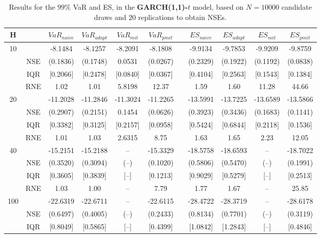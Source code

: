 \footnotesize{  
{ \renewcommand{\arraystretch}{1.3} 
\begin{longtable}{ccccccccccc}  
\caption{Results for the $99\%$ VaR and ES, in the \textbf{GARCH(1,1)-$t$} model, based on $N=10000$ candidate draws and $20$ replications to obtain NSEs.} 
\label{tab:res_algos_t_garch2_noS} \\ 
 H & & $VaR_{naive}$ & $VaR_{adapt}$ & $VaR_{mit}$  & $VaR_{pmit}$ &  & $ES_{naive}$ & $ES_{adapt}$ & $ES_{mit}$ & $ES_{pmit}$ \\ \hline 
10 & & -8.1484 & -8.1257 & -8.2091 & -8.1808 & & -9.9134 & -9.7853 & -9.9209 & -9.8759  \\ 
  & NSE & (0.1836) & (0.1748) & 0.0531 & (0.0267) & & (0.2329) & (0.1922) & (0.1192) & (0.0838)   \\ 
 & IQR & $[$0.2066$]$ & $[$0.2478$]$ & $[$0.0840$]$ & $[$0.0367$]$ & & $[$0.4104$]$ & $[$0.2563$]$  &$[$0.1543$]$ & $[$0.1384$]$  \\  
  & RNE &   1.02 &   1.01 & 5.8198 &  12.37 &  &  1.59 &   1.60 &   11.28 &  44.66   \\ [1ex] 
20 & & -11.2028 & -11.2846 & -11.3024 & -11.2265 & & -13.5991 & -13.7225 & -13.6589 & -13.5866  \\ 
  & NSE & (0.2907) & (0.2151) & 0.1454 & (0.0626) & & (0.3923) & (0.3436) & (0.1683) & (0.1141)   \\ 
 & IQR & $[$0.3382$]$ & $[$0.3125$]$ & $[$0.2157$]$ & $[$0.0958$]$ & & $[$0.5424$]$ & $[$0.6844$]$  &$[$0.2118$]$ & $[$0.1536$]$  \\  
  & RNE &   1.01 &   1.03 & 2.6315 &   8.75 &  &  1.63 &   1.65 &    2.23 &  12.05   \\ [1ex] 
40 & & -15.2151 & -15.2188 & -- & -15.3329 & & -18.5758 & -18.6593 & -- & -18.7022  \\ 
  & NSE & (0.3520) & (0.3094) & (--) & (0.1020) & & (0.5806) & (0.5470) & (--) & (0.1991)   \\ 
 & IQR & $[$0.3605$]$ & $[$0.3839$]$ & $[$--$]$& $[$0.1213$]$ & & $[$0.9029$]$ & $[$0.5279$]$  &$[$--$]$& $[$0.2513$]$  \\  
  & RNE &   1.03 &   1.00 &    -- &   7.79 &  &  1.77 &   1.67 &     -- &  25.85   \\ [1ex] 
100 & & -22.6319 & -22.6711 & -- & -22.6115 & & -28.4722 & -28.3719 & -- & -28.6178  \\ 
  & NSE & (0.6497) & (0.4005) & (--) & (0.2433) & & (0.8134) & (0.7701) & (--) & (0.3119)   \\ 
 & IQR & $[$0.8049$]$ & $[$0.5865$]$ & $[$--$]$& $[$0.4399$]$ & & $[$1.0842$]$ & $[$1.2843$]$  &$[$--$]$& $[$0.4846$]$  \\  

\end{longtable}}}
